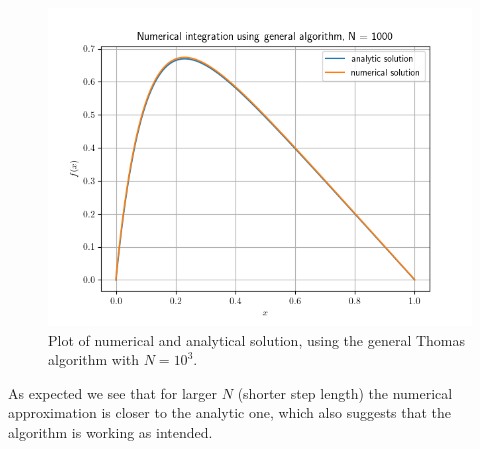 \documentclass[english,notitlepage,reprint]{revtex4-1}  %
\begin{document}
\begin{figure}[H]
	\centering
	\label{fig:iv:a:3}
	\includegraphics[width=\columnwidth]{plots/Figure_3.png}
	\caption{Plot of numerical and analytical solution, using the general Thomas algorithm with
	\(N=10^{3}\).}
\end{figure}


As expected we see that for larger $N$ (shorter step length) the numerical approximation is closer to the analytic one, which also suggests that the algorithm is working as intended.  
 
\end{document}
